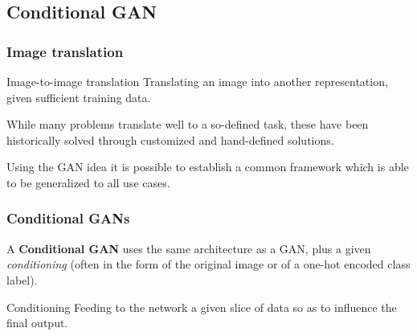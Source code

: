 %
%

\subsection{Conditional GAN}

\begin{frame}
    \frametitle{Image translation}
    \begin{block}{Image-to-image translation}
        Translating an image into another representation, given sufficient training data.
    \end{block}

    While many problems translate well to a so-defined task, these have been historically solved through customized and hand-defined solutions.

    Using the GAN idea it is possible to establish a common framework which is able to be generalized to all use cases. \cite{pix2pix}

\end{frame}

\begin{frame}
    \frametitle{Conditional GANs}
    A \textbf{Conditional GAN} uses the same architecture as a GAN, plus a given \emph{conditioning} (often in the form of the original image or of a one-hot encoded class label).

    \begin{block}{Conditioning}
        Feeding to the network a given slice of data so as to influence the final output.
    \end{block}
\end{frame}

